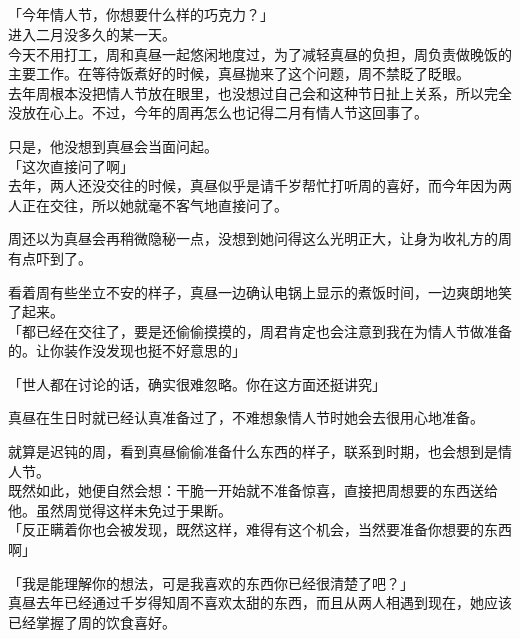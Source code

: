 \subsection{}

「今年情人节，你想要什么样的巧克力？」\\

进入二月没多久的某一天。\\

今天不用打工，周和真昼一起悠闲地度过，为了减轻真昼的负担，周负责做晚饭的主要工作。在等待饭煮好的时候，真昼抛来了这个问题，周不禁眨了眨眼。\\

去年周根本没把情人节放在眼里，也没想过自己会和这种节日扯上关系，所以完全没放在心上。不过，今年的周再怎么也记得二月有情人节这回事了。

只是，他没想到真昼会当面问起。\\

「这次直接问了啊」\\

去年，两人还没交往的时候，真昼似乎是请千岁帮忙打听周的喜好，而今年因为两人正在交往，所以她就毫不客气地直接问了。

周还以为真昼会再稍微隐秘一点，没想到她问得这么光明正大，让身为收礼方的周有点吓到了。

看着周有些坐立不安的样子，真昼一边确认电锅上显示的煮饭时间，一边爽朗地笑了起来。\\

「都已经在交往了，要是还偷偷摸摸的，周君肯定也会注意到我在为情人节做准备的。让你装作没发现也挺不好意思的」

「世人都在讨论的话，确实很难忽略。你在这方面还挺讲究」

真昼在生日时就已经认真准备过了，不难想象情人节时她会去很用心地准备。

就算是迟钝的周，看到真昼偷偷准备什么东西的样子，联系到时期，也会想到是情人节。\\

既然如此，她便自然会想：干脆一开始就不准备惊喜，直接把周想要的东西送给他。虽然周觉得这样未免过于果断。\\

「反正瞒着你也会被发现，既然这样，难得有这个机会，当然要准备你想要的东西啊」

「我是能理解你的想法，可是我喜欢的东西你已经很清楚了吧？」\\

真昼去年已经通过千岁得知周不喜欢太甜的东西，而且从两人相遇到现在，她应该已经掌握了周的饮食喜好。

